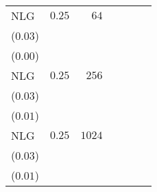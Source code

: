 \begin{table*}[t]
\begin{tabular}{lrrrrrr}
NLG & \(0.25\) & \(64\) & \longcell{\(0.47\)\\{\tiny(\(0.03\))}} & \longcell{\(0.09\)\\{\tiny(\(0.00\))}} \\[2.2ex]
NLG & \(0.25\) & \(256\) & \longcell{\(0.64\)\\{\tiny(\(0.03\))}} & \longcell{\(0.11\)\\{\tiny(\(0.01\))}} \\[2.2ex]
NLG & \(0.25\) & \(1024\) & \longcell{\(0.69\)\\{\tiny(\(0.03\))}} & \longcell{\(0.11\)\\{\tiny(\(0.01\))}} \\[2.2ex]

\end{tabular}
\end{table*}

